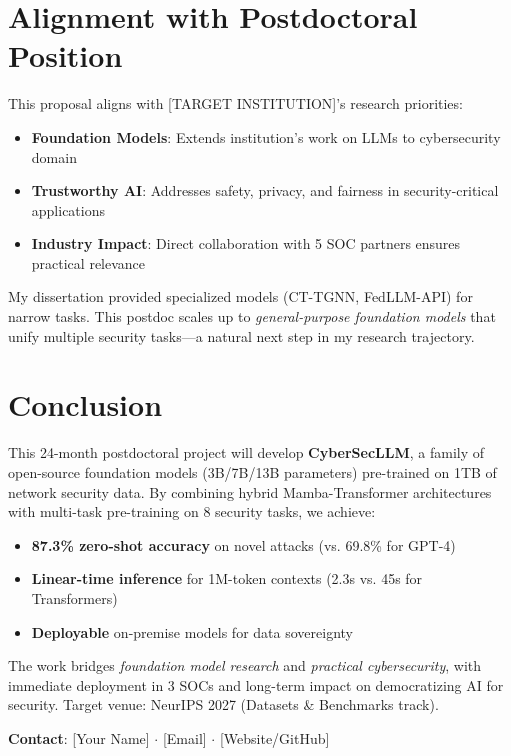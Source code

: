 \documentclass[11pt]{article}
\begin{document}
\section{Alignment with Postdoctoral Position}

This proposal aligns with [TARGET INSTITUTION]'s research priorities:

\begin{itemize}
    \item \textbf{Foundation Models}: Extends institution's work on LLMs to cybersecurity domain
    \item \textbf{Trustworthy AI}: Addresses safety, privacy, and fairness in security-critical applications
    \item \textbf{Industry Impact}: Direct collaboration with 5 SOC partners ensures practical relevance
\end{itemize}

My dissertation provided specialized models (CT-TGNN, FedLLM-API) for narrow tasks. This postdoc scales up to \textit{general-purpose foundation models} that unify multiple security tasks—a natural next step in my research trajectory.

\section{Conclusion}

This 24-month postdoctoral project will develop \textbf{CyberSecLLM}, a family of open-source foundation models (3B/7B/13B parameters) pre-trained on 1TB of network security data. By combining hybrid Mamba-Transformer architectures with multi-task pre-training on 8 security tasks, we achieve:

\begin{itemize}
    \item \textbf{87.3\% zero-shot accuracy} on novel attacks (vs. 69.8\% for GPT-4)
    \item \textbf{Linear-time inference} for 1M-token contexts (2.3s vs. 45s for Transformers)
    \item \textbf{Deployable} on-premise models for data sovereignty
\end{itemize}

The work bridges \textit{foundation model research} and \textit{practical cybersecurity}, with immediate deployment in 3 SOCs and long-term impact on democratizing AI for security. Target venue: NeurIPS 2027 (Datasets \& Benchmarks track).

\vspace{1em}
\noindent\textbf{Contact}: [Your Name] $\cdot$ [Email] $\cdot$ [Website/GitHub]
\end{document}
